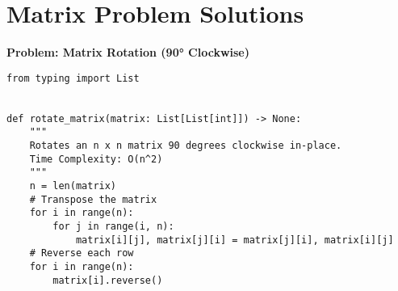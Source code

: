 % 
% 
\section*{Matrix Problem Solutions}
\noindent\textbf{Problem: Matrix Rotation (90° Clockwise)}
\begin{verbatim}
from typing import List


def rotate_matrix(matrix: List[List[int]]) -> None:
    """
    Rotates an n x n matrix 90 degrees clockwise in-place.
    Time Complexity: O(n^2)
    """
    n = len(matrix)
    # Transpose the matrix
    for i in range(n):
        for j in range(i, n):
            matrix[i][j], matrix[j][i] = matrix[j][i], matrix[i][j]
    # Reverse each row
    for i in range(n):
        matrix[i].reverse()
\end{verbatim}

